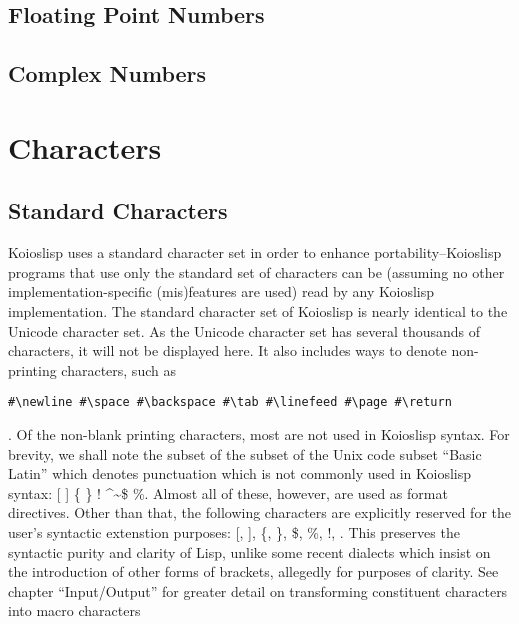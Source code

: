 \documentclass[10pt]{book}
\newcommand{\tab}{\hspace*{2em}}
\begin{document}
\subsection{Floating Point Numbers}
\subsection{Complex Numbers}
\section{Characters}
\subsection{Standard Characters}
Koioslisp uses a standard character set in order to enhance portability--Koioslisp programs that use only the standard set of characters can be (assuming no other implementation-specific (mis)features are used) read by any Koioslisp implementation.
The standard character set of {\sc Koioslisp} is nearly identical to the Unicode character set. As the Unicode character set has several thousands of characters, it will not be displayed here. It also includes ways to denote non-printing characters, such as \begin{verbatim}#\newline #\space #\backspace #\tab #\linefeed #\page #\return \end{verbatim}. Of the non-blank printing characters, most are not used in {\sc Koioslisp} syntax. For brevity, we shall note the subset of  the subset of the Unix code subset ``Basic Latin'' which denotes punctuation which is not commonly used in {\sc  Koioslisp} syntax: [ ] \{ \} !  \textasciicircum \textunderscore \textasciitilde \$ \%. Almost all of these, however, are used as format directives. Other than that, the following characters are explicitly reserved for the user's syntactic extenstion purposes: [, ], \{, \}, \$, \%, !, . This preserves the syntactic purity and clarity of Lisp, unlike some recent dialects which insist on the introduction of other forms of brackets, allegedly for purposes of clarity.  See chapter ``Input/Output'' for greater detail on transforming constituent characters into macro characters %
\end{document}
